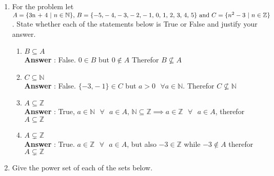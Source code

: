 \documentclass[a4paper,11pt]{article}
\begin{document}
\begin{enumerate}
\begin{enumerate}
  \end{enumerate}
  \newpage
\item For the problem let \( 
A = \lbrace $3n + 4$ \text{ }\vert\text{ }  n \in \mathbb{N} \rbrace \text{, } 
B =  \lbrace -5 \text{,} -4 \text{,} -3 \text{,} -2 \text{,} -1 \text{, } 0 \text{, } 1 \text{, } 2 \text{, } 3 \text{, } 4 \text{, } 5  \rbrace \text{ and } 
C = \lbrace n^2 - 3 \text{ }\vert \text{ }  n \in \mathbb{Z} \rbrace\). State whether each of the statements below is True or False and justify your answer.
  
  \begin{enumerate}
  \item $B \subseteq A$ \\
  \textbf{Answer} : False. $0 \in B$ but $0 \not\in A$ Therefor $B \not\subseteq A$

  \item $C \subseteq \mathbb{N}$ \\
  \textbf{Answer} : False. $\lbrace -3 \text{,} -1 \rbrace \in C$ but  $a > 0\text{ } \forall a \in \mathbb{N}$. Therefor $C \not\subseteq \mathbb{N}$

  \item $A \subseteq \mathbb{Z}$ \\
  \textbf{Answer} : True, $a \in \mathbb{N} \text{ } \forall \text{ } a \in A \text{, } \mathbb{N} \subseteq \mathbb{Z} \implies a \in \mathbb{Z} \text{ } \forall \text{ } a \in A$, therefor $A \subseteq \mathbb{Z}$

  \item $A \subsetneq \mathbb{Z}$ \\
  \textbf{Answer} : True. 
   $a \in \mathbb{Z} \text{ } \forall \text{ } a \in A$, but also $-3 \in \mathbb{Z}$ while $-3 \not\in A$  therefor $A \subsetneq \mathbb{Z}$

  \end{enumerate}

\item Give the power set of each of the sets below.


\end{enumerate}
\end{document}
